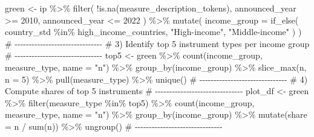 \documentclass[
  letterpaper,
  DIV=11,
  numbers=noendperiod]{scrartcl}
\newenvironment{Shaded}{\begin{snugshade}}{\end{snugshade}}
\newcommand{\AttributeTok}[1]{\textcolor[rgb]{0.40,0.45,0.13}{#1}}
\newcommand{\CommentTok}[1]{\textcolor[rgb]{0.37,0.37,0.37}{#1}}
\newcommand{\DecValTok}[1]{\textcolor[rgb]{0.68,0.00,0.00}{#1}}
\newcommand{\FunctionTok}[1]{\textcolor[rgb]{0.28,0.35,0.67}{#1}}
\newcommand{\NormalTok}[1]{\textcolor[rgb]{0.00,0.23,0.31}{#1}}
\newcommand{\OtherTok}[1]{\textcolor[rgb]{0.00,0.23,0.31}{#1}}
\newcommand{\SpecialCharTok}[1]{\textcolor[rgb]{0.37,0.37,0.37}{#1}}
\newcommand{\StringTok}[1]{\textcolor[rgb]{0.13,0.47,0.30}{#1}}
\begin{document}
\begin{Shaded}
\begin{Highlighting}[]
\NormalTok{green }\OtherTok{\textless{}{-}}\NormalTok{ ip }\SpecialCharTok{\%\textgreater{}\%}
  \FunctionTok{filter}\NormalTok{(}
    \SpecialCharTok{!}\FunctionTok{is.na}\NormalTok{(measure\_description\_tokens),}
\NormalTok{    announced\_year }\SpecialCharTok{\textgreater{}=} \DecValTok{2010}\NormalTok{,}
\NormalTok{    announced\_year }\SpecialCharTok{\textless{}=} \DecValTok{2022}
\NormalTok{  ) }\SpecialCharTok{\%\textgreater{}\%}
  \FunctionTok{mutate}\NormalTok{(}
    \AttributeTok{income\_group =} \FunctionTok{if\_else}\NormalTok{(}
\NormalTok{      country\_std }\SpecialCharTok{\%in\%}\NormalTok{ high\_income\_countries,}
      \StringTok{"High{-}income"}\NormalTok{,}
      \StringTok{"Middle{-}income"}
\NormalTok{    )}
\NormalTok{  )}
\CommentTok{\# {-}{-}{-}{-}{-}{-}{-}{-}{-}{-}{-}{-}{-}{-}{-}{-}{-}{-}{-}{-}{-}{-}{-}{-}{-}{-}{-}{-}{-}{-}{-}}
\CommentTok{\# 3) Identify top 5 instrument types per income group }
\CommentTok{\# {-}{-}{-}{-}{-}{-}{-}{-}{-}{-}{-}{-}{-}{-}{-}{-}{-}{-}{-}{-}{-}{-}{-}{-}{-}{-}{-}{-}{-}{-}{-}}
\NormalTok{top5 }\OtherTok{\textless{}{-}}\NormalTok{ green }\SpecialCharTok{\%\textgreater{}\%}
  \FunctionTok{count}\NormalTok{(income\_group, measure\_type, }\AttributeTok{name =} \StringTok{"n"}\NormalTok{) }\SpecialCharTok{\%\textgreater{}\%}
  \FunctionTok{group\_by}\NormalTok{(income\_group) }\SpecialCharTok{\%\textgreater{}\%}
  \FunctionTok{slice\_max}\NormalTok{(n, }\AttributeTok{n =} \DecValTok{5}\NormalTok{) }\SpecialCharTok{\%\textgreater{}\%}
  \FunctionTok{pull}\NormalTok{(measure\_type) }\SpecialCharTok{\%\textgreater{}\%}
  \FunctionTok{unique}\NormalTok{()}
\CommentTok{\# {-}{-}{-}{-}{-}{-}{-}{-}{-}{-}{-}{-}{-}{-}{-}{-}{-}{-}{-}{-}{-}{-}{-}{-}{-}{-}{-}{-}{-}{-}{-}}
\CommentTok{\#  4) Compute shares of top 5 instruments }
\CommentTok{\# {-}{-}{-}{-}{-}{-}{-}{-}{-}{-}{-}{-}{-}{-}{-}{-}{-}{-}{-}{-}{-}{-}{-}{-}{-}{-}{-}{-}{-}{-}{-}}
\NormalTok{plot\_df }\OtherTok{\textless{}{-}}\NormalTok{ green }\SpecialCharTok{\%\textgreater{}\%}
  \FunctionTok{filter}\NormalTok{(measure\_type }\SpecialCharTok{\%in\%}\NormalTok{ top5) }\SpecialCharTok{\%\textgreater{}\%}
  \FunctionTok{count}\NormalTok{(income\_group, measure\_type, }\AttributeTok{name =} \StringTok{"n"}\NormalTok{) }\SpecialCharTok{\%\textgreater{}\%}
  \FunctionTok{group\_by}\NormalTok{(income\_group) }\SpecialCharTok{\%\textgreater{}\%}
  \FunctionTok{mutate}\NormalTok{(}\AttributeTok{share =}\NormalTok{ n }\SpecialCharTok{/} \FunctionTok{sum}\NormalTok{(n)) }\SpecialCharTok{\%\textgreater{}\%}
  \FunctionTok{ungroup}\NormalTok{()}
\CommentTok{\# {-}{-}{-}{-}{-}{-}{-}{-}{-}{-}{-}{-}{-}{-}{-}{-}{-}{-}{-}{-}{-}{-}{-}{-}{-}{-}{-}{-}{-}{-}{-}}

\end{Highlighting}
\end{Shaded}
\end{document}
